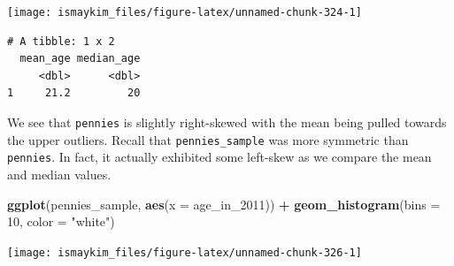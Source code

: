 \documentclass[12pt,]{krantz}
\makeatletter
\newenvironment{Shaded}{\begin{snugshade}}{\end{snugshade}}
\newcommand{\KeywordTok}[1]{\textcolor[rgb]{0.27,0.27,0.27}{\textbf{#1}}}
\newcommand{\DataTypeTok}[1]{\textcolor[rgb]{0.27,0.27,0.27}{#1}}
\newcommand{\DecValTok}[1]{\textcolor[rgb]{0.06,0.06,0.06}{#1}}
\newcommand{\StringTok}[1]{\textcolor[rgb]{0.5,0.5,0.5}{#1}}
\newcommand{\OperatorTok}[1]{\textcolor[rgb]{0.43,0.43,0.43}{\textbf{#1}}}
\newcommand{\NormalTok}[1]{#1}
\newenvironment{kframe}{%
\medskip{}
\setlength{\fboxsep}{.8em}
 \def\at@end@of@kframe{}%
 \ifinner\ifhmode%
  \def\at@end@of@kframe{\end{minipage}}%
  \begin{minipage}{\columnwidth}%
 \fi\fi%
 \def\FrameCommand##1{\hskip\@totalleftmargin \hskip-\fboxsep
 \colorbox{shadecolor}{##1}\hskip-\fboxsep
     \hskip-\linewidth \hskip-\@totalleftmargin \hskip\columnwidth}%
 \MakeFramed {\advance\hsize-\width
   \@totalleftmargin\z@ \linewidth\hsize
   \@setminipage}}%
 {\par\unskip\endMakeFramed%
 \at@end@of@kframe}
\renewenvironment{Shaded}{\begin{kframe}}{\end{kframe}}
\makeatother
\begin{document}
\begin{center}\texttt{[image: ismaykim\_files/figure-latex/unnamed-chunk-324-1]} \end{center}

\begin{Shaded}
\end{Shaded}

\begin{verbatim}
# A tibble: 1 x 2
  mean_age median_age
     <dbl>      <dbl>
1     21.2         20
\end{verbatim}

We see that \texttt{pennies} is slightly right-skewed with the mean
being pulled towards the upper outliers. Recall that
\texttt{pennies\_sample} was more symmetric than \texttt{pennies}. In
fact, it actually exhibited some left-skew as we compare the mean and
median values.

\begin{Shaded}
\begin{Highlighting}[]
\KeywordTok{ggplot}\NormalTok{(pennies_sample, }\KeywordTok{aes}\NormalTok{(}\DataTypeTok{x =}\NormalTok{ age_in_}\DecValTok{2011}\NormalTok{)) }\OperatorTok{+}
\StringTok{  }\KeywordTok{geom_histogram}\NormalTok{(}\DataTypeTok{bins =} \DecValTok{10}\NormalTok{, }\DataTypeTok{color =} \StringTok{"white"}\NormalTok{)}
\end{Highlighting}
\end{Shaded}

\begin{center}\texttt{[image: ismaykim\_files/figure-latex/unnamed-chunk-326-1]} \end{center}

\begin{Shaded}
\end{Shaded}
\end{document}
